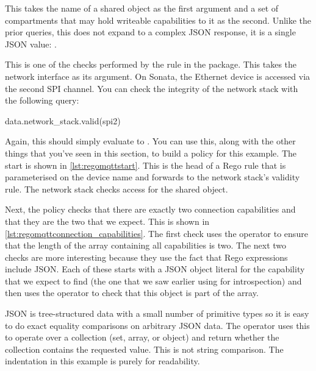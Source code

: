 \begin{regosnippet}
data.compartment.shared_object_writeable_allow_list(
	"sntp_time_at_last_sync",
	{"SNTP"\})
\end{regosnippet}

This takes the name of a shared object as the first argument and a set of compartments that may hold writeable capabilities to it as the second.
Unlike the prior queries, this does not expand to a complex JSON response, it is a single JSON value: .

This is one of the checks performed by the  rule in the  package.
This takes the network interface as its argument.
On Sonata, the Ethernet device is accessed via the second SPI channel.
You can check the integrity of the network stack with the following query:

\begin{regosnippet}
data.network_stack.valid(spi2)
\end{regosnippet}

Again, this should simply evaluate to .
You can use this, along with the other things that you've seen in this section, to build a policy for this example.
The start is shown in \ref{lst:regomqttstart}.
This is the head of a Rego rule that is parameterised on the device name and forwards to the network stack's validity rule.
The network stack checks access for the shared object.

\regolisting[filename=examples/mqtt/mqtt.rego,marker=network_stack,label=lst:regomqttstart,caption="The start of the Rego policy for the MQTT example."]{}

Next, the policy checks that there are exactly two connection capabilities and that they are the two that we expect.
This is shown in \ref{lst:regomqttconnection_capabilities}.
The first check uses the  operator to ensure that the length of the array containing all capabilities is two.
The next two checks are more interesting because they use the fact that Rego expressions include JSON.
Each of these starts with a JSON object literal for the capability that we expect to find (the one that we saw earlier using  for introspection) and then uses the  operator to check that this object is part of the array.

JSON is tree-structured data with a small number of primitive types so it is easy to do exact equality comparisons on arbitrary JSON data.
The  operator uses this to operate over a collection (set, array, or object) and return whether the collection contains the requested value.
This is not string comparison.
The indentation in this example is purely for readability.

